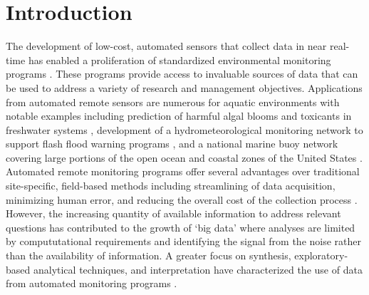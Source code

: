 \documentclass[10pt,letterpaper]{article}\usepackage[]{graphicx}\usepackage[]{color}
\begin{document}
\linenumbers

\section*{Introduction}

The development of low-cost, automated sensors that collect data in near real-time has enabled a proliferation of standardized environmental monitoring programs \cite{Glasgow04,Fries08}.  These programs provide access to invaluable sources of data that can be used to address a variety of research and management objectives.  Applications from automated remote sensors are numerous for aquatic environments with notable examples including prediction of harmful algal blooms and toxicants in freshwater systems \cite{Reed10}, development of a hydrometeorological monitoring network to support flash flood warning programs \cite{HADS15}, and a national marine buoy network covering large portions of the open ocean and coastal zones of the United States \cite{NDBC15}.  Automated remote monitoring programs offer several advantages over traditional site-specific, field-based methods including streamlining of data acquisition, minimizing human error, and reducing the overall cost of the collection process \cite{Glasgow04}.  However, the increasing quantity of available information to address relevant questions has contributed to the growth of `big data' where analyses are limited by compututational requirements and identifying the signal from the noise rather than the availability of information. A greater focus on synthesis, exploratory-based analytical techniques, and interpretation have characterized the use of data from automated monitoring programs \cite{Campbell13,Millie13}.
\end{document}
